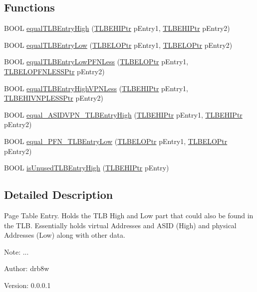 \subsection*{Functions}
\begin{CompactItemize}
\item 
BOOL \hyperlink{group___v_m_m___p_t_e_gb048909cf624c30137211a111e947112}{equalTLBEntryHigh} (\hyperlink{struct_t_l_b_e_h_i}{TLBEHIPtr} pEntry1, \hyperlink{struct_t_l_b_e_h_i}{TLBEHIPtr} pEntry2)
\item 
BOOL \hyperlink{group___v_m_m___p_t_e_gae1fa5dc951be8567919098dbb0d3255}{equalTLBEntryLow} (\hyperlink{struct_t_l_b_e_l_o}{TLBELOPtr} pEntry1, \hyperlink{struct_t_l_b_e_l_o}{TLBELOPtr} pEntry2)
\item 
BOOL \hyperlink{group___v_m_m___p_t_e_g39d9945124ca0c249463753e6e67716b}{equalTLBEntryLowPFNLess} (\hyperlink{struct_t_l_b_e_l_o}{TLBELOPtr} pEntry1, \hyperlink{struct_t_l_b_e_l_o_p_f_n_l_e_s_s}{TLBELOPFNLESSPtr} pEntry2)
\item 
BOOL \hyperlink{group___v_m_m___p_t_e_gd1c7bd735d03446658cc746c07187839}{equalTLBEntryHighVPNLess} (\hyperlink{struct_t_l_b_e_h_i}{TLBEHIPtr} pEntry1, \hyperlink{struct_t_l_b_e_h_i_v_n_p_l_e_s_s}{TLBEHIVNPLESSPtr} pEntry2)
\item 
BOOL \hyperlink{group___v_m_m___p_t_e_g9903712483c2afdfad28dcca0768115f}{equal\_\-ASIDVPN\_\-TLBEntryHigh} (\hyperlink{struct_t_l_b_e_h_i}{TLBEHIPtr} pEntry1, \hyperlink{struct_t_l_b_e_h_i}{TLBEHIPtr} pEntry2)
\item 
BOOL \hyperlink{group___v_m_m___p_t_e_g58ccb6826bcf8c712b7c69d18b928f7e}{equal\_\-PFN\_\-TLBEntryLow} (\hyperlink{struct_t_l_b_e_l_o}{TLBELOPtr} pEntry1, \hyperlink{struct_t_l_b_e_l_o}{TLBELOPtr} pEntry2)
\item 
BOOL \hyperlink{group___v_m_m___p_t_e_g89cd5f7eaa1cd827f630285c9a56443c}{isUnusedTLBEntryHigh} (\hyperlink{struct_t_l_b_e_h_i}{TLBEHIPtr} pEntry)
\end{CompactItemize}


\subsection{Detailed Description}
Page Table Entry. Holds the TLB High and Low part that could also be found in the TLB. Essentially holds virtual Addresses and ASID (High) and physical Addresses (Low) along with other data. 

\begin{Desc}
\item[Note:]... \end{Desc}
\begin{Desc}
\item[Author:]drb8w \end{Desc}
\begin{Desc}
\item[Version:]0.0.0.1 \end{Desc}


